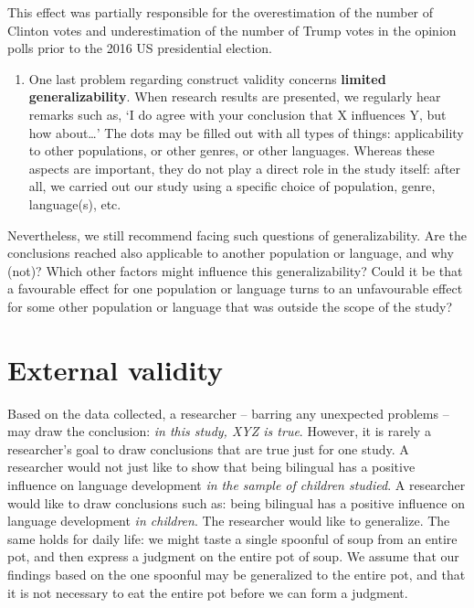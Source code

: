 \documentclass[
]{book}
\providecommand{\tightlist}{%
  \setlength{\itemsep}{0pt}\setlength{\parskip}{0pt}}
\begin{document}
This effect was partially responsible for the overestimation of the number of Clinton votes and underestimation of the number of Trump votes in the opinion polls prior to the 2016 US presidential election.

\begin{enumerate}
\def\labelenumi{\arabic{enumi}.}
\setcounter{enumi}{6}
\tightlist
\item
  One last problem regarding construct validity concerns \textbf{limited generalizability}. When research results are presented, we regularly hear remarks such as, `I do agree with your conclusion that X influences Y, but how about\ldots{}' The dots may be filled out with all types of things: applicability to other populations, or other genres, or other languages. Whereas these aspects are important, they do not play a direct role in the study itself: after all, we carried out our study using a specific choice of population, genre, language(s), etc.
\end{enumerate}

Nevertheless, we still recommend facing such questions of generalizability. Are the conclusions reached also applicable to another population or language, and why (not)? Which other factors might influence this generalizability? Could it be that a favourable effect for one population or language turns to an unfavourable effect for some other population or language that was outside the scope of the study?

\section{External validity}\label{sec:externalvalidity}

Based on the data collected, a researcher -- barring any unexpected problems -- may draw the conclusion: \emph{in this study, XYZ is true}. However, it is rarely a researcher's goal to draw conclusions that are true just for one study. A researcher would not just like to show that being bilingual has a positive influence on language development \emph{in the sample of children studied}. A researcher would like to draw conclusions such as: being bilingual has a positive influence on language development \emph{in children}. The researcher would like to generalize. The same holds for daily life: we might taste a single spoonful of soup from an entire pot, and then express a judgment on the entire pot of soup. We assume that our findings based on the one spoonful may be generalized to the entire pot, and that it is not necessary to eat the entire pot before we can form a judgment.
\end{document}
